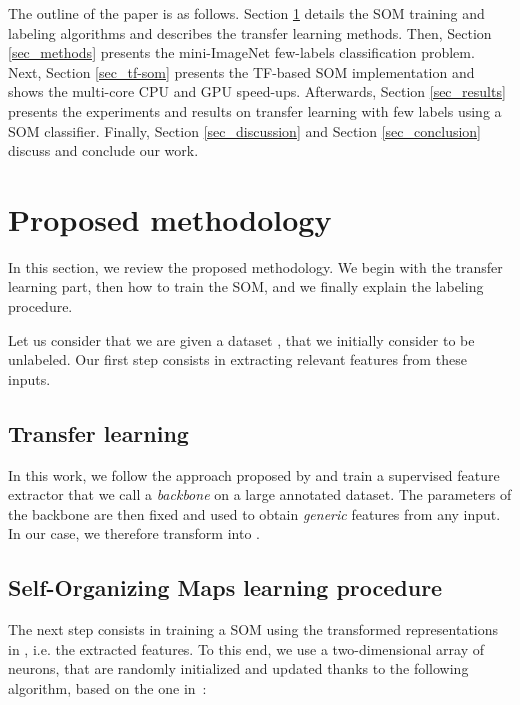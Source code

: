 \documentclass[runningheads]{llncs}
\begin{document}
The outline of the paper is as follows. Section \ref{sec_state-of-art} details the SOM training and labeling algorithms and describes the transfer learning methods. Then, Section \ref{sec_methods} presents the mini-ImageNet few-labels classification problem. Next, Section \ref{sec_tf-som} presents the TF-based SOM implementation and shows the multi-core CPU and GPU speed-ups. Afterwards, Section \ref{sec_results} presents the experiments and results on transfer learning with few labels using a SOM classifier. Finally, Section \ref{sec_discussion} and Section \ref{sec_conclusion} discuss and conclude our work.



\section{Proposed methodology}
\label{sec_state-of-art}

In this section, we review the proposed methodology. We begin with the transfer learning part, then how to train the SOM, and we finally explain the labeling procedure.

Let us consider that we are given a dataset , that we initially consider to be unlabeled. Our first step consists in extracting relevant features from these inputs.


\subsection{Transfer learning}

In this work, we follow the approach proposed by \cite{hu2020accurate_few_shot} and train a supervised feature extractor  that we call a \emph{backbone} on a large annotated dataset. The parameters of the backbone are then fixed and used to obtain \emph{generic} features from any input. In our case, we therefore transform  into .

\subsection{Self-Organizing Maps learning procedure}

The next step consists in training a SOM using the transformed representations in , i.e. the extracted features. To this end, we use a two-dimensional array of  neurons, that are randomly initialized and updated thanks to the following algorithm, based on the one in~\cite{kohonen1990som}:
\end{document}
